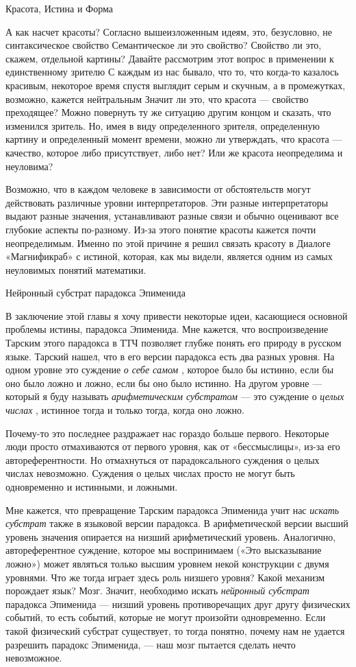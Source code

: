 \documentclass[../main.tex]{subfiles}
\begin{document}
Красота, Истина и Форма

А как насчет красоты? Согласно вышеизложенным идеям, это, безусловно, не синтаксическое свойство Семантическое ли это свойство? Свойство ли это, скажем, отдельной картины? Давайте рассмотрим этот вопрос в применении к единственному зрителю С каждым из нас бывало, что то, что когда-то казалось красивым, некоторое время спустя выглядит серым и скучным, а в промежутках, возможно, кажется нейтральным Значит ли это, что красота --- свойство преходящее? Можно повернуть ту же ситуацию другим концом и сказать, что изменился зритель. Но, имея в виду определенного зрителя, определенную картину и определенный момент времени, можно ли утверждать, что красота --- качество, которое либо присутствует, либо нет? Или же красота неопределима и неуловима?

Возможно, что в каждом человеке в зависимости от обстоятельств могут действовать различные уровни интерпретаторов. Эти разные интерпретаторы выдают разные значения, устанавливают разные связи и обычно оценивают все глубокие аспекты по-разному. Из-за этого понятие красоты кажется почти неопределимым. Именно по этой причине я решил связать красоту в Диалоге «Магнификраб» с истиной, которая, как мы видели, является одним из самых неуловимых понятий математики.

Нейронный субстрат парадокса Эпименида

В заключение этой главы я хочу привести некоторые идеи, касающиеся основной проблемы истины, парадокса Эпименида. Мне кажется, что воспроизведение Тарским этого парадокса в ТТЧ позволяет глубже понять его природу в русском языке. Тарский нашел, что в его версии парадокса есть два разных уровня. На одном уровне это суждение \emph{о себе самом} , которое было бы истинно, если бы оно было ложно и ложно, если бы оно было истинно. На другом уровне --- который я буду называть \emph{арифметическим субстратом} --- это суждение о \emph{целых числах} , истинное тогда и только тогда, когда оно ложно.

Почему-то это последнее раздражает нас гораздо больше первого. Некоторые люди просто отмахиваются от первого уровня, как от «бессмыслицы», из-за его автореферентности. Но отмахнуться от парадоксального суждения о целых числах невозможно. Суждения о целых числах просто не могут быть одновременно и истинными, и ложными.

Мне кажется, что превращение Тарским парадокса Эпименида учит нас \emph{искать субстрат} также в языковой версии парадокса. В арифметической версии высший уровень значения опирается на низший арифметический уровень. Аналогично, автореферентное суждение, которое мы воспринимаем («Это высказывание ложно») может являться только высшим уровнем некой конструкции с двумя уровнями. Что же тогда играет здесь роль низшего уровня? Какой механизм порождает язык? Мозг. Значит, необходимо искать \emph{нейронный субстрат} парадокса Эпименида --- низший уровень противоречащих друг другу физических событий, то есть событий, которые не могут произойти одновременно. Если такой физический субстрат существует, то тогда понятно, почему нам не удается разрешить парадокс Эпименида, --- наш мозг пытается сделать нечто невозможное.
\end{document}
